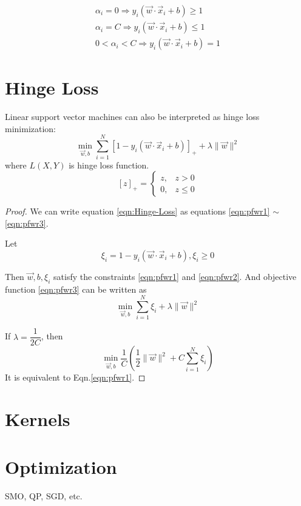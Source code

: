 \begin{eqnarray}
\alpha_i=0 \Rightarrow y_i(\vec{w} \cdot \vec{x}_i+b)\geqslant 1 \\
\alpha_i=C \Rightarrow y_i(\vec{w} \cdot \vec{x}_i+b)\leqslant 1 \\
0<\alpha_i<C \Rightarrow y_i(\vec{w} \cdot \vec{x}_i+b)= 1
\end{eqnarray}


\section{Hinge Loss}
Linear support vector machines can also be interpreted as hinge loss minimization:
\begin{equation}\label{eqn:Hinge-Loss}
\min_{\vec{w},b} \sum\limits_{i=1}^N{[1-y_i(\vec{w} \cdot \vec{x}_i + b)]}_+ + \lambda\|\vec{w}\|^2
\end{equation}
where $L(X,Y)$ is hinge loss function.
\begin{equation}
{[z]}_+ = \begin{cases}
z,  & z > 0 \\
0,  & z \leqslant 0
\end{cases}
\end{equation}

\begin{proof}
We can write equation \eqref{eqn:Hinge-Loss} as equations \eqref{eqn:pfwr1} $\sim$ \eqref{eqn:pfwr3}.

Let 
\begin{equation}
\xi_i= 1-y_i(\vec{w} \cdot \vec{x}_i + b),\xi_i \geqslant 0
\end{equation}

Then $\vec{w},b,\xi_i$ satisfy the constraints \eqref{eqn:pfwr1} and \eqref{eqn:pfwr2}. And objective function \eqref{eqn:pfwr3} can be written as
\begin{equation}
\min_{\vec{w},b} \sum\limits_{i=1}^N{\xi_i}+ \lambda\|\vec{w}\|^2 \nonumber
\end{equation}

If $\lambda=\dfrac{1}{2C}$, then 
\begin{equation}
\min_{\vec{w},b} \dfrac{1}{C}\left(\dfrac{1}{2}\|\vec{w}\|^2+C\sum\limits_{i=1}^N{\xi_i}\right)
\end{equation}
It is equivalent to Eqn.\eqref{eqn:pfwr1}.

\end{proof}

\section{Kernels}


\section{Optimization}
SMO, QP, SGD, etc.
